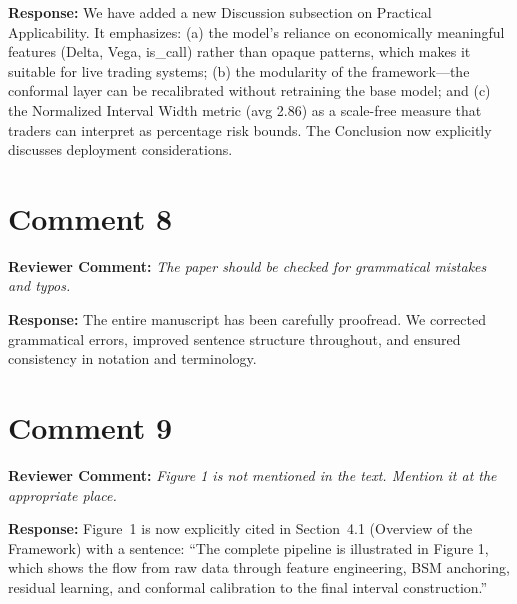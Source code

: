 \documentclass[11pt]{article}
\newcommand{\rev}[1]{\textbf{Reviewer Comment:} \textit{#1}}
\newcommand{\resp}[1]{\textbf{Response:} #1}
\begin{document}
\resp{We have added a new Discussion subsection on Practical Applicability. It emphasizes: (a) the model's reliance on economically meaningful features (Delta, Vega, is\_call) rather than opaque patterns, which makes it suitable for live trading systems; (b) the modularity of the framework---the conformal layer can be recalibrated without retraining the base model; and (c) the Normalized Interval Width metric (avg 2.86) as a scale-free measure that traders can interpret as percentage risk bounds. The Conclusion now explicitly discusses deployment considerations.}

\section*{Comment 8}
\rev{The paper should be checked for grammatical mistakes and typos.}

\resp{The entire manuscript has been carefully proofread. We corrected grammatical errors, improved sentence structure throughout, and ensured consistency in notation and terminology.}

\section*{Comment 9}
\rev{Figure 1 is not mentioned in the text. Mention it at the appropriate place.}

\resp{Figure~1 is now explicitly cited in Section~4.1 (Overview of the Framework) with a sentence: ``The complete pipeline is illustrated in Figure 1, which shows the flow from raw data through feature engineering, BSM anchoring, residual learning, and conformal calibration to the final interval construction.'' }
\end{document}
